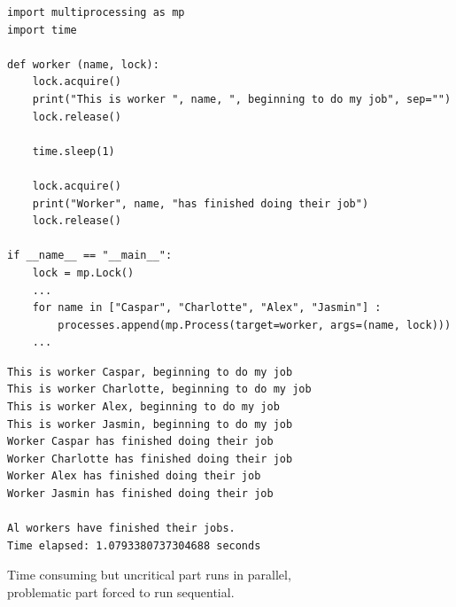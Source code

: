
\begin{frame}[fragile]
%
\begin{codebox}
\begin{verbatim}
import multiprocessing as mp
import time

def worker (name, lock):
    lock.acquire()
    print("This is worker ", name, ", beginning to do my job", sep="")
    lock.release()
    
    time.sleep(1)
    
    lock.acquire()
    print("Worker", name, "has finished doing their job")
    lock.release()

if __name__ == "__main__":
    lock = mp.Lock()
    ...
    for name in ["Caspar", "Charlotte", "Alex", "Jasmin"] :
        processes.append(mp.Process(target=worker, args=(name, lock)))
    ...
\end{verbatim}
\end{codebox}
%
\end{frame}


\begin{frame}[fragile]
%
\begin{cmdbox}
\begin{verbatim}
This is worker Caspar, beginning to do my job
This is worker Charlotte, beginning to do my job
This is worker Alex, beginning to do my job
This is worker Jasmin, beginning to do my job
Worker Caspar has finished doing their job
Worker Charlotte has finished doing their job
Worker Alex has finished doing their job
Worker Jasmin has finished doing their job

Al workers have finished their jobs.
Time elapsed: 1.0793380737304688 seconds
\end{verbatim}
\end{cmdbox}

\begin{center}
\Thus Time consuming but uncritical part runs in parallel,\\
	problematic part forced to run sequential.
\end{center}
%
\end{frame}

